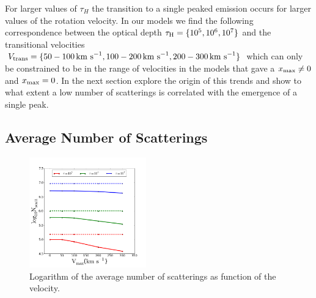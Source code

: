\documentclass[usenatbib]{mn2e}
\newcommand{\kms}{{\ifmmode{{\mathrm{\,km\ s}^{-1}}}\else{\,km~s$^{-1}$}\fi}}
\begin{document}
For larger values of $\tau_{H}$ the transition to a single peaked
emission occurs for larger values of the rotation velocity. In our
models we find the following correspondence between the optical depth
$\tau_{\rm H}=\{10^5, 10^6, 10^7\}$ and the transitional velocities $V_{\rm
  trans}=\{50-100\kms, 100-200\kms, 200-300\kms\}$ which can only be constrained to be in the range of velocities in the models that gave a $x_{\rm
  max}\neq 0$ and $x_{\rm max}=0$.   In the next section explore the
origin of this trends and show to what extent a low number of
scatterings is correlated with the emergence of a single peak.



\subsection{Average Number of Scatterings}


\begin{figure}
    \includegraphics[width=0.45\textwidth]{NscattvsVmax.png}
\caption{Logarithm of the average number of scatterings as function of
  the velocity. \label{fig:Nscatt}}   
\end{figure}
\end{document}
